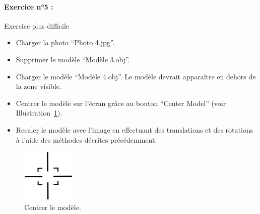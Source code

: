 \documentclass[12pt]{report}
\begin{document}
\begin{appendices}
\paragraph{Exercice n°5 :}Exercice plus difficile
\begin{itemize}
\item Charger la photo ``Photo 4.jpg''.
\item Supprimer le modèle ``Modèle 3.obj''.
\item Charger le modèle ``Modèle 4.obj''. Le modèle devrait apparaître en dehors de la zone visible.
\item Centrer le modèle sur l'écran grâce au bouton ``Center Model'' (voir Illustration~\ref{center}).
\item Recaler le modèle avec l'image en effectuant des translations et des rotations à l'aide des méthodes décrites précédemment.
\end{itemize}

\begin{figure}[H]
\centerline{\includegraphics[scale = 0.8]{img/icons/center.png}}
\caption{Centrer le modèle.}
\label{center}
\end{figure}


\end{appendices}
\end{document}
